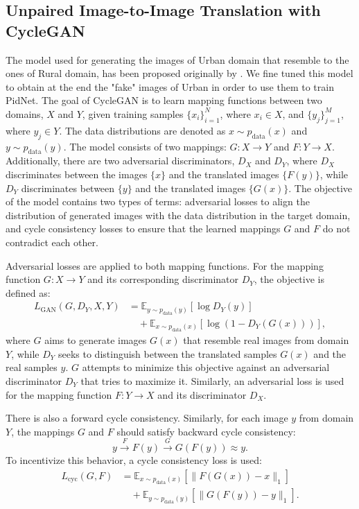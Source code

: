 \documentclass[10pt,twocolumn,letterpaper]{article}
\begin{document}
\subsection{Unpaired Image-to-Image Translation with CycleGAN}
The model used for generating the images of Urban domain that resemble to the ones of Rural domain, has been proposed originally by \cite{zhu2020cyclegan}. We fine tuned this model to obtain at the end the "fake" images of Urban in order to use them to train PidNet.
The goal of CycleGAN is to learn mapping functions between two domains, \(X\) and \(Y\), given training samples \(\{ x_i \}_{i=1}^N\), where \(x_i \in X\), and \(\{ y_j \}_{j=1}^M\), where \(y_j \in Y\). The data distributions are denoted as \(x \sim p_{\text{data}}(x)\) and \(y \sim p_{\text{data}}(y)\). The model consists of two mappings: \(G: X \rightarrow Y\) and \(F: Y \rightarrow X\). Additionally, there are two adversarial discriminators, \(D_X\) and \(D_Y\), where \(D_X\) discriminates between the images \(\{ x \}\) and the translated images \(\{ F(y) \}\), while \(D_Y\) discriminates between \(\{ y \}\) and the translated images \(\{ G(x) \}\). The objective of the model contains two types of terms: adversarial losses to align the distribution of generated images with the data distribution in the target domain, and cycle consistency losses to ensure that the learned mappings \(G\) and \(F\) do not contradict each other.

Adversarial losses are applied to both mapping functions. For the mapping function \(G: X \rightarrow Y\) and its corresponding discriminator \(D_Y\), the objective is defined as:
\begin{align}
L_{\text{GAN}}(G, D_Y, X, Y) &= \mathbb{E}_{y \sim p_{\text{data}}(y)} \left[ \log D_Y(y) \right] \nonumber \\
&\quad + \mathbb{E}_{x \sim p_{\text{data}}(x)} \left[ \log(1 - D_Y(G(x))) \right],
\end{align}
where \(G\) aims to generate images \(G(x)\) that resemble real images from domain \(Y\), while \(D_Y\) seeks to distinguish between the translated samples \(G(x)\) and the real samples \(y\). \(G\) attempts to minimize this objective against an adversarial discriminator \(D_Y\) that tries to maximize it.
Similarly, an adversarial loss is used for the mapping function \(F: Y \rightarrow X\) and its discriminator \(D_X\).

There is also a forward cycle consistency. Similarly, for each image \( y \) from domain \( Y \), the mappings \( G \) and \( F \) should satisfy backward cycle consistency:
\[
y \xrightarrow{F} F(y) \xrightarrow{G} G(F(y)) \approx y.
\]
To incentivize this behavior, a cycle consistency loss is used:
\begin{align}
L_{\text{cyc}}(G, F) &= \mathbb{E}_{x \sim p_{\text{data}}(x)} \left[ \| F(G(x)) - x \|_1 \right] \nonumber \\
&\quad + \mathbb{E}_{y \sim p_{\text{data}}(y)} \left[ \| G(F(y)) - y \|_1 \right].
\end{align}
\end{document}
